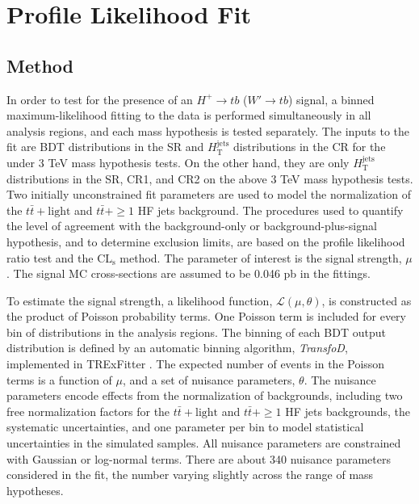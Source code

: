 \section{Profile Likelihood Fit} 
\label{sec:ProfileLikelohoodFit}

\subsection{Method}
\label{subsec:FitMethod}
In order to test for the presence of an $H^{+}{\rightarrow}tb$ ($W'{\rightarrow}tb$) signal, a binned maximum-likelihood fitting to the data is performed simultaneously in all analysis regions, and each mass hypothesis is tested separately. The inputs to the fit are BDT distributions in the SR and $H_{\text{T}}^{\text{jets}}$ distributions in the CR for the under 3 TeV mass hypothesis tests. On the other hand, they are only $H_\text{T}^{\text{jets}}$ distributions in the SR, CR1, and CR2 on the above 3 TeV mass hypothesis tests. Two initially unconstrained fit parameters are used to model the normalization of the $t\bar{t}+\text{light}$ and $t\bar{t}+\geq 1$ HF jets background. The procedures used to quantify the level of agreement with the background-only or background-plus-signal hypothesis, and to determine exclusion limits, are based on the profile likelihood ratio test and the $\text{CL}_{\text{s}}$ method. The parameter of interest is the signal strength, $\mu$. The signal MC cross-sections are assumed to be 0.046 pb in the fittings.

To estimate the signal strength, a likelihood function, $\mathcal{L}({\mu},{\theta})$, is constructed as the product of Poisson probability terms. One Poisson term is included for every bin of distributions in the analysis regions. The binning of each BDT output distribution is defined by an automatic binning algorithm, \textit{TransfoD}, implemented in TRExFitter \cite{Binning-TTHFilter}. The expected number of events in the Poisson terms is a function of $\mu$, and a set of nuisance parameters, ${\theta}$. The nuisance parameters encode effects from the normalization of backgrounds, including two free normalization factors for the $t\bar{t}+\text{light}$ and $t\bar{t}+\geq 1$ HF jets backgrounds, the systematic uncertainties, and one parameter per bin to model statistical uncertainties in the simulated samples. All nuisance parameters are constrained with Gaussian or log-normal terms. There are about 340 nuisance parameters considered in the fit, the number varying slightly across the range of mass hypotheses.


